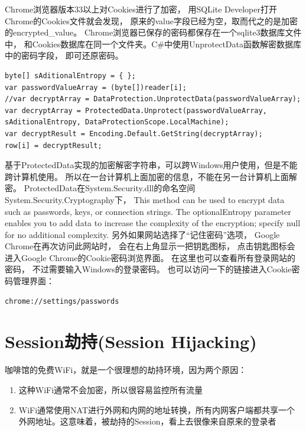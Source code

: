 \documentclass{book}
\begin{document}
Chrome浏览器版本33以上对Cookies进行了加密，
用SQLite Developer打开Chrome的Cookies文件就会发现，
原来的value字段已经为空，取而代之的是加密的encrypted\_value。
Chrome浏览器已保存的密码都保存在一个sqlite3数据库文件中，
和Cookies数据库在同一个文件夹。C\#中使用UnprotectData函数解密数据库中的密码字段，
即可还原密码。

\begin{lstlisting}[language={[Sharp]C},caption=解密Cookie]
byte[] sAditionalEntropy = { };
var passwordValueArray = (byte[])reader[i];
//var decryptArray = DataProtection.UnprotectData(passwordValueArray);
var decryptArray = ProtectedData.Unprotect(passwordValueArray, sAditionalEntropy, DataProtectionScope.LocalMachine);
var decryptResult = Encoding.Default.GetString(decryptArray);
row[i] = decryptResult;
\end{lstlisting}

基于ProtectedData实现的加密解密字符串，可以跨Windows用户使用，但是不能跨计算机使用。
所以在一台计算机上面加密的信息，不能在另一台计算机上面解密。
ProtectedData在System.Security.dll的命名空间System.Security.Cryptography下，
This method can be used to encrypt data such as passwords, 
keys, or connection strings. 
The optionalEntropy parameter enables you to add data to 
increase the complexity of the encryption; 
specify null for no additional complexity.
另外如果网站选择了“记住密码”选项，
Google Chrome在再次访问此网站时，
会在右上角显示一把钥匙图标，
点击钥匙图标会进入Google Chrome的Cookie密码浏览界面。
在这里也可以查看所有登录网站的密码，
不过需要输入Windows的登录密码。
也可以访问一下的链接进入Cookie密码管理界面：

\begin{lstlisting}[language=HTML]
chrome://settings/passwords
\end{lstlisting}


\section{Session劫持(Session Hijacking)}

咖啡馆的免费WiFi，就是一个很理想的劫持环境，因为两个原因：

\begin{enumerate}
\setcounter{enumi}{0}
\item{这种WiFi通常不会加密，所以很容易监控所有流量}
\item{WiFi通常使用NAT进行外网和内网的地址转换，所有内网客户端都共享一个外网地址。这意味着，被劫持的Session，看上去很像来自原来的登录者}
\end{enumerate}
\end{document}
